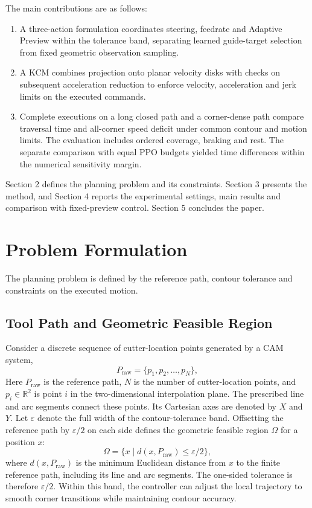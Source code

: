 \documentclass[preprint,12pt,nonatbib]{elsarticle}
\begin{document}
\begin{samepage}
The main contributions are as follows:
\begin{enumerate}
\item[(1)] A three-action formulation coordinates steering, feedrate and Adaptive Preview within the tolerance band, separating learned guide-target selection from fixed geometric observation sampling.
\item[(2)] A KCM combines projection onto planar velocity disks with checks on subsequent acceleration reduction to enforce velocity, acceleration and jerk limits on the executed commands.
\item[(3)] Complete executions on a long closed path and a corner-dense path compare traversal time and all-corner speed deficit under common contour and motion limits. The evaluation includes ordered coverage, braking and rest. The separate comparison with equal PPO budgets yielded time differences within the numerical sensitivity margin.
\end{enumerate}
\end{samepage}

Section 2 defines the planning problem and its constraints. Section 3 presents the method, and Section 4 reports the experimental settings, main results and comparison with fixed-preview control. Section 5 concludes the paper.

\section{Problem Formulation}
\label{sec:problem_formulation}
The planning problem is defined by the reference path, contour tolerance and constraints on the executed motion.

\subsection{Tool Path and Geometric Feasible Region}
Consider a discrete sequence of cutter-location points generated by a CAM system,
\begin{equation}
P_{\mathrm{raw}}=\{p_1,p_2,\dots,p_N\},
\end{equation}
Here $P_{\mathrm{raw}}$ is the reference path, $N$ is the number of cutter-location points, and $p_i\in\mathbb{R}^2$ is point $i$ in the two-dimensional interpolation plane. The prescribed line and arc segments connect these points. Its Cartesian axes are denoted by $X$ and $Y$. Let $\varepsilon$ denote the full width of the contour-tolerance band. Offsetting the reference path by $\varepsilon/2$ on each side defines the geometric feasible region $\Omega$ for a position $x$:
\begin{equation}
\Omega=\{x\mid d(x,P_{\mathrm{raw}})\leq \varepsilon/2\},
\label{eq:feasible_region}
\end{equation}
where $d(x,P_{\mathrm{raw}})$ is the minimum Euclidean distance from $x$ to the finite reference path, including its line and arc segments. The one-sided tolerance is therefore $\varepsilon/2$. Within this band, the controller can adjust the local trajectory to smooth corner transitions while maintaining contour accuracy.
\end{document}
